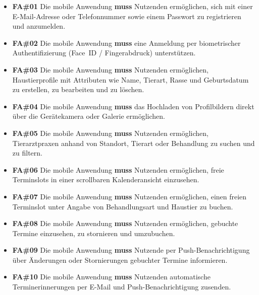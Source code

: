 \begin{itemize}
    \item \textbf{FA\#01} Die mobile Anwendung \textbf{muss} Nutzenden 
    ermöglichen, sich mit einer E-Mail-Adresse oder Telefonnummer sowie 
    einem Passwort zu registrieren und anzumelden.

    \item \textbf{FA\#02} Die mobile Anwendung \textbf{muss} eine Anmeldung per biometrischer Authentifizierung (Face~ID / Fingerabdruck) unterstützen.

    \item \textbf{FA\#03} Die mobile Anwendung \textbf{muss} Nutzenden 
    ermöglichen, Haustierprofile mit Attributen wie Name, Tierart, Rasse 
    und Geburtsdatum zu erstellen, zu bearbeiten und zu löschen.

    \item \textbf{FA\#04} Die mobile Anwendung \textbf{muss} das Hochladen 
    von Profilbildern direkt über die Gerätekamera oder Galerie ermöglichen.

    \item \textbf{FA\#05} Die mobile Anwendung \textbf{muss} Nutzenden 
    ermöglichen, Tierarztpraxen anhand von Standort, Tierart oder Behandlung zu suchen und zu filtern.

    \item \textbf{FA\#06} Die mobile Anwendung \textbf{muss} Nutzenden 
    ermöglichen, freie Terminslots in einer scrollbaren Kalenderansicht 
    einzusehen.

    \item \textbf{FA\#07} Die mobile Anwendung \textbf{muss} Nutzenden 
    ermöglichen, einen freien Terminslot unter Angabe von Behandlungsart 
    und Haustier zu buchen.

    \item \textbf{FA\#08} Die mobile Anwendung \textbf{muss} Nutzenden 
    ermöglichen, gebuchte Termine einzusehen, zu stornieren und umzubuchen.

    \item \textbf{FA\#09} Die mobile Anwendung \textbf{muss} Nutzende 
    per Push-Benachrichtigung über Änderungen oder Stornierungen 
    gebuchter Termine informieren.

    \item \textbf{FA\#10} Die mobile Anwendung \textbf{muss} Nutzenden 
    automatische Terminerinnerungen per E-Mail und Push-Benachrichtigung zusenden.
\end{itemize}

